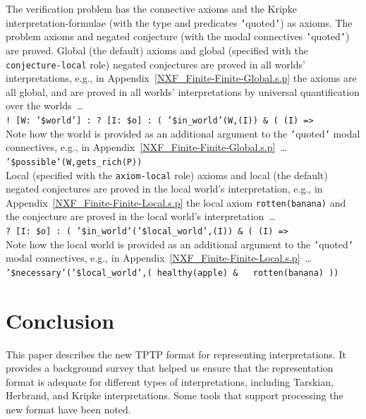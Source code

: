 \documentclass{easychair}
\newcommand{\smalltt}[1]{\small \texttt{#1}}
\begin{document}
The verification problem has the connective axioms and the Kripke interpretation-formulae 
(with the type and predicates {\tt '}quoted{\tt '}) as axioms.
The problem axioms and negated conjecture (with the modal connectives {\tt '}quoted{\tt '})
are proved.
Global (the default) axioms and global (specified with the {\tt conjecture-local} role)
negated conjectures are proved in all worlds' interpretations, e.g., in 
Appendix~\ref{NXF_Finite-Finite-Global.s.p} the axioms are all global, and are proved in
all worlds' interpretations by universal quantification over the worlds~\ldots \\
\hspace*{0.5cm}\smalltt{! [W: '\$world'] : ? [I: \$o] : ( '\$in\_world'(W,(I)) \& ( (I) =>} \\
Note how the world is provided as an additional argument to the {\tt '}quoted{\tt '} modal
connectives, e.g., in Appendix~\ref{NXF_Finite-Finite-Global.s.p}~\ldots \\
\hspace*{0.5cm}\smalltt{’\$possible’(W,gets\_rich(P))} \\
Local (specified with the {\tt axiom-local} role) axioms and local (the default) negated
conjectures are proved in the local world's interpretation, e.g., 
in Appendix~\ref{NXF_Finite-Finite-Local.s.p} the local axiom {\tt rotten(banana)} and
the conjecture are proved in the local world's interpretation~\ldots \\
\hspace*{0.5cm}\smalltt{? [I: \$o] : ( '\$in\_world'('\$local\_world',(I)) \& ( (I) =>} \\
Note how the local world is provided as an additional argument to the {\tt '}quoted{\tt '} 
modal connectives, e.g., in Appendix~\ref{NXF_Finite-Finite-Local.s.p}~\ldots \\
\hspace*{0.5cm}\smalltt{'\$necessary'('\$local\_world',( healthy(apple) \& ~ rotten(banana) ))}

\section{Conclusion}
\label{Conclusion}

This paper describes the new TPTP format for representing interpretations.
It provides a background survey that helped us ensure that the representation format is adequate
for different types of interpretations, including Tarskian, Herbrand, and Kripke interpretations.
Some tools that support processing the new format have been noted.
\end{document}
